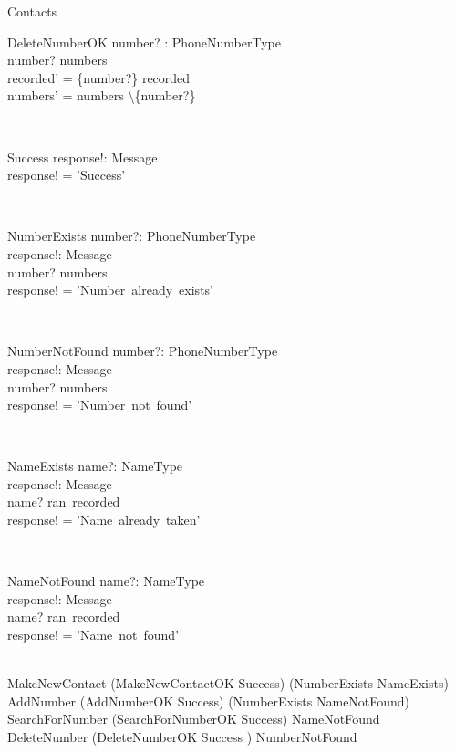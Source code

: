 \begin{class}{Contacts}
\begin{op}{DeleteNumberOK}
number? : PhoneNumberType\\
\ST
number? \in numbers\\
recorded' = \{number?\} \ndres recorded\\
numbers' = numbers \backslash \{number?\}\\
\end{op}\\
\begin{op}{Success}
response!: Message \\
\ST
response! = 'Success'
\end{op}\\
\zbreak
\begin{op}{NumberExists}
number?: PhoneNumberType \\
response!: Message \\
\ST
number? \in numbers \\
response! = 'Number~already~exists'
\end{op}\\
\zbreak
\begin{op}{NumberNotFound}
number?: PhoneNumberType \\
response!: Message \\
\ST
number? \notin numbers \\
response! = 'Number~not~found'
\end{op}\\
\begin{op}{NameExists}
name?: NameType \\
response!: Message \\
\ST
name? \in ran~recorded \\
response! = 'Name~already~taken'
\end{op}\\
\also
\begin{op}{NameNotFound}
    name?: NameType \\
    response!: Message \\
    \ST
    name? \notin ran~recorded \\
    response! = 'Name~not~found'
\end{op}\\
\also
MakeNewContact \sdef (MakeNewContactOK \wedge Success) \oplus (NumberExists \lor NameExists) \\
AddNumber \sdef (AddNumberOK \wedge Success) \oplus (NumberExists \lor NameNotFound) \\
SearchForNumber \sdef (SearchForNumberOK \wedge Success) \oplus NameNotFound \\
DeleteNumber \sdef (DeleteNumberOK \wedge Success ) \oplus NumberNotFound  \\
\end{class}
